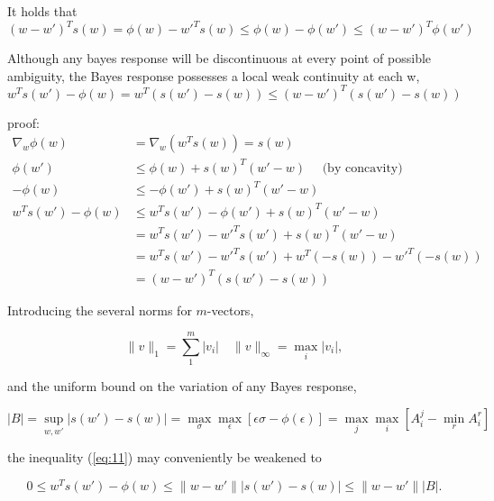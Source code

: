 \documentclass[11pt]{article}
\theoremstyle{boldStyle}
\begin{document}
It holds that 
\begin{equation} \label{eq:10}
    (w - w')^T s(w) = \phi(w) - w'^T s(w) \leq \phi(w) - \phi(w') \leq (w - w')^T \phi(w')
\end{equation}

Although any bayes response will be discontinuous at every point of possible ambiguity, the Bayes response possesses a local weak continuity at each w,
\begin{equation} \label{eq:11}
    w^T s(w') - \phi(w) = w^T (s(w') - s(w)) \leq (w - w')^T (s(w') - s(w)) 
\end{equation}

proof:
\begin{align*}
    \nabla_w \phi(w) &= \nabla_w (w^T s(w)) = s(w) \\
    \phi(w') &\leq \phi(w) + s(w)^T (w' - w) \quad \text{ (by concavity) } \\
    -\phi(w) &\leq -\phi(w') + s(w)^T (w' - w) \\
    w^T s(w') - \phi(w) &\leq w^T s(w') -\phi(w') + s(w)^T (w' - w) \\
    &= w^T s(w') - w'^T s(w') + s(w)^T (w' - w) \\
    &= w^T s(w') - w'^T s(w') + w^T (-s(w)) - w'^T (-s(w)) \\
    &= (w - w')^T (s(w') - s(w)) 
\end{align*}


Introducing the several norms for \( m \)-vectors,

\begin{equation} \label{eq:12}
\|v\|_1 = \sum_{1}^{m} |v_i| \quad \|v\|_\infty = \max_{i} |v_i|,
\end{equation}

and the uniform bound on the variation of any Bayes response,

\begin{equation} \label{eq:13}
|B| = \sup_{w, w'} |s(w') - s(w)| = \max_{\sigma} \max_{\epsilon} [\epsilon \sigma - \phi (\epsilon)] = \max_{j} \max_{i} [A^j_i - \min_{r}A^r_i]
\end{equation}

the inequality (\ref{eq:11}) may conveniently be weakened to

\begin{bluebox}
\begin{equation} \label{eq:14}
0 \leq w^T s(w') - \phi(w) \leq \|w - w'\| |s(w') - s(w)| \leq \|w - w'\| |B|.
\end{equation}
\end{bluebox}
\end{document}
